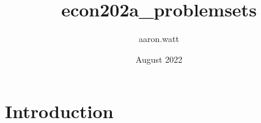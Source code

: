 \documentclass{article}
\title{econ202a_problemsets}
\author{aaron.watt }
\date{August 2022}
\begin{document}
\maketitle

\section{Introduction}
\end{document}
